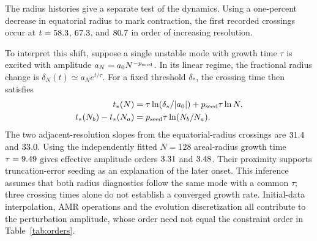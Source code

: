 \documentclass[twocolumn,floatfix,aps,prd,superscriptaddress,nofootinbib]{revtex4-2}
\begin{document}
The radius histories give a separate test of the dynamics. Using a one-percent decrease in equatorial radius to mark contraction, the first recorded crossings occur at $t=58.3$, $67.3$, and $80.7$ in order of increasing resolution.

To interpret this shift, suppose a single unstable mode with growth time
$\tau$ is excited with amplitude $a_N=a_0N^{-p_{\rm seed}}$. In its linear
regime, the fractional radius change is $\delta_N(t)\simeq a_Ne^{t/\tau}$.
For a fixed threshold $\delta_*$, the crossing time then satisfies
\begin{equation}
\begin{aligned}
t_*(N)&=\tau\ln(\delta_*/|a_0|)+p_{\rm seed}\tau\ln N,\\
t_*(N_b)-t_*(N_a)&=p_{\rm seed}\tau\ln(N_b/N_a).
\end{aligned}
\label{eq:onset-scaling}
\end{equation}
The two adjacent-resolution slopes from the equatorial-radius crossings
are $31.4$ and $33.0$. Using the independently
fitted $N=128$ areal-radius growth time $\tau=9.49$ gives
effective amplitude orders $3.31$ and $3.48$.
Their proximity supports truncation-error seeding as an explanation of
the later onset. This inference assumes that both radius diagnostics
follow the same mode with a common $\tau$; three crossing times alone do
not establish a converged growth rate. Initial-data interpolation, AMR
operations and the evolution discretization all contribute to the
perturbation amplitude, whose order need not equal the constraint order
in Table~\ref{tab:orders}.
\end{document}

